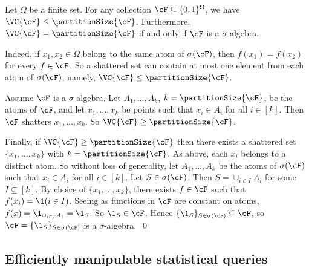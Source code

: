 \documentclass{toc}
\begin{document}
\begin{remark}
	Let $\Omega$ be a finite set. For any collection $\cF \subseteq \{0,1\}^\Omega$, we have $\VC{\cF} \leq \partitionSize{\cF}$. Furthermore, $\VC{\cF} = \partitionSize{\cF}$ if and only if $\cF$ is a $\sigma$-algebra. 
	
	Indeed, if $x_1,x_2 \in \Omega$ belong to the same atom of $\sigma(\cF)$, then $f(x_1) = f(x_2)$ for every $f \in \cF$. So a shattered set can contain at most one element from each atom of $\sigma(\cF)$, namely, $\VC{\cF} \leq \partitionSize{\cF}$. 
	
	Assume $\cF$ is a $\sigma$-algebra. Let $A_1,\dots,A_k$, $k = \partitionSize{\cF}$, be the atoms of $\cF$, and let $x_1,\dots,x_k$ be points such that $x_i \in A_i$ for all $i \in [k]$. Then $\cF$ shatters $x_1,\dots,x_k$. So $\VC{\cF} \geq \partitionSize{\cF}$. 
	
	Finally, if $\VC{\cF} \geq \partitionSize{\cF}$ then there exists a shattered set $\{x_1,\dots,x_k\}$ with $k = \partitionSize{\cF}$. As above, each $x_i$ belongs to a distinct atom. So without loss of generality, let $A_1,\dots,A_k$ be the atoms of $\sigma(\cF)$ such that $x_i \in A_i$ for all $i \in [k]$. Let $S \in \sigma(\cF)$. Then $S = \cup_{i \in I}A_i$ for some $I \subseteq [k]$. By choice of $\{x_1,\dots,x_k\}$, there exists $f \in \cF$ such that $f(x_i) = \1(i \in I)$. Seeing as functions in $\cF$ are constant on atoms, $f(x) = \1_{\cup_{i \in I}A_i} = \1_S$. So $\1_S \in \cF$. Hence $\{\1_S\}_{S \in \sigma(\cF)} \subseteq \cF$, so $\cF = \{\1_S\}_{S \in \sigma(\cF)}$ is a $\sigma$-algebra.~\qed
\end{remark}

\subsection{Efficiently manipulable statistical queries}

\end{document}
